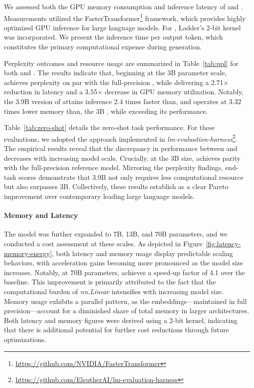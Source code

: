 We assessed both the GPU memory consumption and inference latency of  and . Measurements utilized the FasterTransformer\footnote{\url{https://github.com/NVIDIA/FasterTransformer}} framework, which provides highly optimized GPU inference for large language models. For , Ladder’s 2-bit kernel~\cite{ladder} was incorporated. We present the inference time per output token, which constitutes the primary computational expense during generation.

Perplexity outcomes and resource usage are summarized in Table~\ref{tab:ppl} for both  and . The results indicate that, beginning at the 3B parameter scale,  achieves perplexity on par with the full-precision , while delivering a 2.71$\times$ reduction in latency and a 3.55$\times$ decrease in GPU memory utilization. Notably, the 3.9B version of  attains inference 2.4 times faster than, and operates at 3.32 times lower memory than, the 3B , while exceeding its performance.

Table~\ref{tab:zero-shot} details the zero-shot task performance. For these evaluations, we adopted the approach implemented in \emph{lm-evaluation-harness}\footnote{\url{https://github.com/EleutherAI/lm-evaluation-harness}}. The empirical results reveal that the discrepancy in performance between  and  decreases with increasing model scale. Crucially, at the 3B size,  achieves parity with the full-precision reference model. Mirroring the perplexity findings, end-task scores demonstrate that  3.9B not only requires less computational resource but also surpasses  3B. Collectively, these results establish  as a clear Pareto improvement over contemporary leading large language models.

\paragraph{Memory and Latency}

The model was further expanded to 7B, 13B, and 70B parameters, and we conducted a cost assessment at these scales. As depicted in Figure~\ref{fig:latency-memory-energy}, both latency and memory usage display predictable scaling behaviors, with acceleration gains becoming more pronounced as the model size increases. Notably, at 70B parameters,  achieves a speed-up factor of 4.1 over the  baseline. This improvement is primarily attributed to the fact that the computational burden of \emph{nn.Linear} intensifies with increasing model size. Memory usage exhibits a parallel pattern, as the embeddings—maintained in full precision—account for a diminished share of total memory in larger architectures. Both latency and memory figures were derived using a 2-bit kernel, indicating that there is additional potential for further cost reductions through future optimizations.

